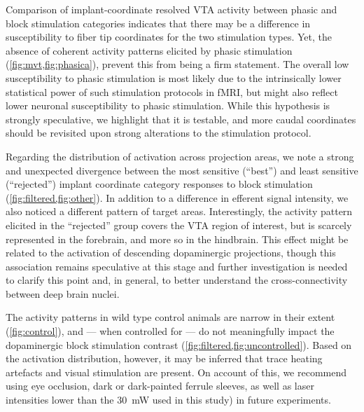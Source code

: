Comparison of implant-coordinate resolved VTA activity between phasic and block stimulation categories indicates that there may be a difference in susceptibility to fiber tip coordinates for the two stimulation types.
Yet, the absence of coherent activity patterns elicited by phasic stimulation (\cref{fig:mvt,fig:phasica}), prevent this from being a firm statement.
The overall low susceptibility to phasic stimulation is most likely due to the intrinsically lower statistical power of such stimulation protocols in fMRI, but might also reflect lower neuronal susceptibility to phasic stimulation.
While this hypothesis is strongly speculative, we highlight that it is testable, and more caudal coordinates should be revisited upon strong alterations to the stimulation protocol.

Regarding the distribution of activation across projection areas, we note a strong and unexpected divergence between the most sensitive (“best”) and least sensitive (“rejected”) implant coordinate category responses to block stimulation (\cref{fig:filtered,fig:other}).
In addition to a difference in efferent signal intensity, we also noticed a different pattern of target areas.
Interestingly, the activity pattern elicited in the “rejected” group covers the VTA region of interest, but is scarcely represented in the forebrain, and more so in the hindbrain.
This effect might be related to the activation of descending dopaminergic projections, though this association remains speculative at this stage and further investigation is needed to clarify this point and, in general, to better understand the cross-connectivity between deep brain nuclei.

The activity patterns in wild type control animals are narrow in their extent (\cref{fig:control}), and --- when controlled for --- do not meaningfully impact the dopaminergic block stimulation contrast (\cref{fig:filtered,fig:uncontrolled}).
Based on the activation distribution, however, it may be inferred that trace heating artefacts and visual stimulation are present.
On account of this, we recommend using eye occlusion, dark or dark-painted ferrule sleeves, as well as laser intensities lower than the \SI{30}{\milli\watt} used in this study) in future experiments.

